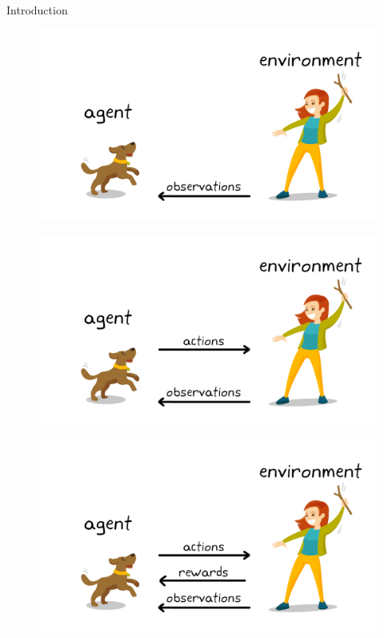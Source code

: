 \begin{frame}[allowframebreaks]{Introduction}
\begin{figure}
    \end{figure}
\framebreak
    \begin{figure}
        \centering
        \includegraphics[height=0.9\textheight,width=\textwidth,keepaspectratio]{images/intro/observations.png}
    \end{figure}
\framebreak
    \begin{figure}
        \centering
        \includegraphics[height=0.9\textheight,width=\textwidth,keepaspectratio]{images/intro/actions.png}
    \end{figure}
\framebreak
    \begin{figure}
        \centering
        \includegraphics[height=0.9\textheight,width=\textwidth,keepaspectratio]{images/intro/rewards.png}

\end{figure}
\end{frame}
